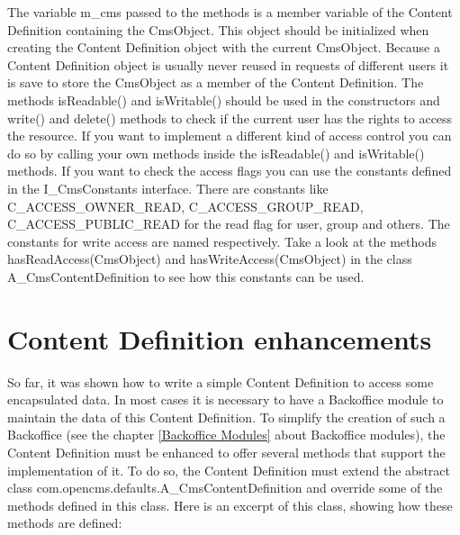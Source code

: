 The variable m\_cms passed to the methods is a member variable of the
Content Definition containing the {\class CmsObject}. This object should
be initialized when creating the Content Definition object with the current
{\class CmsObject}. Because a Content Definition object is usually never reused in 
requests of different users it is save to store the {\class CmsObject} as a member
of the Content Definition. The methods {\meth isReadable()} and {\meth isWritable()}
should be used in the constructors and {\meth write()} and {\meth delete()} methods to check
if the current user has the rights to access the resource.
If you want to implement a different kind of access control
you can do so by calling your own methods inside the {\meth isReadable()}
and {\meth isWritable()} methods. If you want to check the access flags you can use
the constants defined in the {\class I\_CmsConstants} interface. There are constants
like  C\_ACCESS\_OWNER\_READ, C\_ACCESS\_GROUP\_READ, C\_ACCESS\_PUBLIC\_READ for the read flag for
user, group and others. The constants for write access are named respectively. Take a look
at the methods {\meth hasReadAccess(CmsObject)} and {\meth hasWriteAccess(CmsObject)}
in the class \\
{\class A\_CmsContentDefinition} to see how this constants can be used.

\section{Content Definition enhancements}
\label{enhancements}
So far, it was shown how to write a simple Content Definition to access
some encapsulated data. In most cases it is necessary to have a Backoffice 
module to maintain the data of this Content Definition. To
simplify the creation of such a Backoffice (see the chapter \ref{Backoffice Modules} about 
Backoffice modules), the Content Definition must be enhanced to offer
several methods that support the implementation of it. To do so, the
Content Definition must extend the abstract class {\class com.opencms.defaults.A\_CmsContentDefinition}
and override some of the methods defined in this class. Here is an excerpt of this
class, showing how these methods are defined:

